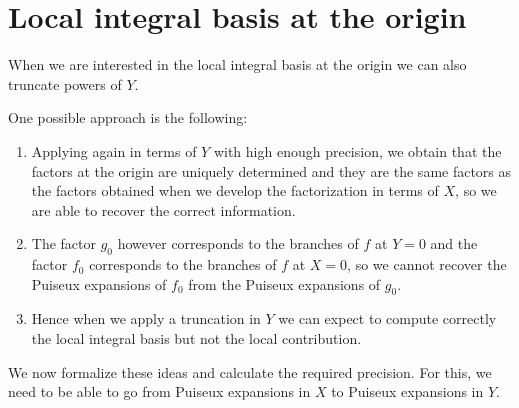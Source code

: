 \documentclass[a4paper,11pt]{amsart}%
\theoremstyle{definition}
\theoremstyle{plain}
\theoremstyle{remark}
\begin{document}
\section{Local integral basis at the origin}

When we are interested in the local integral basis at the origin we can also truncate powers of $Y$.

One possible approach is the following:
\begin{enumerate}
\item Applying again \cite[Proposition 23]{poteaux2021}  in terms of $Y$ with high enough precision, we obtain that the factors at the origin are uniquely determined and they are the same factors as the factors obtained when we develop the factorization in terms of $X$, so we are able to recover the correct information.
\item The factor $g_0$ however corresponds to the branches of $f$ at $Y = 0$ and the factor $f_0$ corresponds to the branches of $f$ at $X = 0$, so we cannot recover the Puiseux expansions of $f_0$ from the Puiseux expansions of $g_0$.
\item Hence when we apply a truncation in $Y$ we can expect to compute correctly the local integral basis but not the local contribution.
\end{enumerate}

We now formalize these ideas and calculate the required precision. For this, we need to be able to go from Puiseux expansions in $X$ to Puiseux expansions in $Y$.
\end{document}
